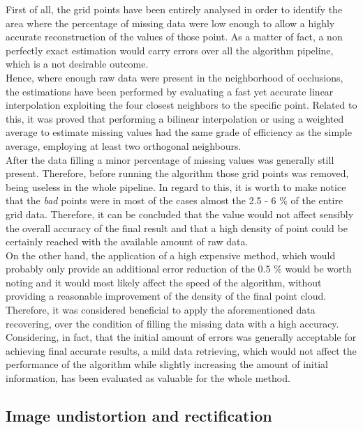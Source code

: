 First of all, the grid points have been entirely analysed in order to identify the area where the percentage of missing data were low enough to allow a highly accurate reconstruction of the values of those point.
As a matter of fact, a non perfectly exact estimation would carry errors over all the algorithm pipeline, which is a not desirable outcome. \\
Hence, where enough raw data were present in the neighborhood of occlusions, the estimations have been performed by evaluating a fast yet accurate linear interpolation exploiting the four closest neighbors to the specific point. 
Related to this, it was proved that performing a bilinear interpolation or using a weighted average to estimate missing values had the same grade of efficiency as the simple average, employing at least two orthogonal neighbours. \\
After the data filling a minor percentage of missing values was generally still present. 
Therefore, before running the algorithm those grid points was removed, being useless in the whole pipeline.
In regard to this, it is worth to make notice that the \textit{bad} points were in most of the cases almost the 2.5 - 6 \% of the entire grid data. 
Therefore, it can be concluded that the value would not affect sensibly the overall accuracy of the final result and that a high density of point could be certainly reached with the available amount of raw data.\\
On the other hand, the application of a high expensive method, which would probably only provide an additional error reduction of the 0.5 \% would be worth noting and it would most likely affect the speed of the algorithm, without providing a reasonable improvement of the density of the final point cloud.
Therefore, it was considered beneficial to apply the aforementioned data recovering, over the condition of filling the missing data with a high accuracy. 
Considering, in fact, that the initial amount of errors was generally acceptable for achieving final accurate results, a mild data retrieving, which would not affect the performance of the algorithm while slightly increasing the amount of initial information, has been evaluated as valuable for the whole method.

\subsection{Image undistortion and rectification}
\label{subsection:img-undist-and-rectific}

